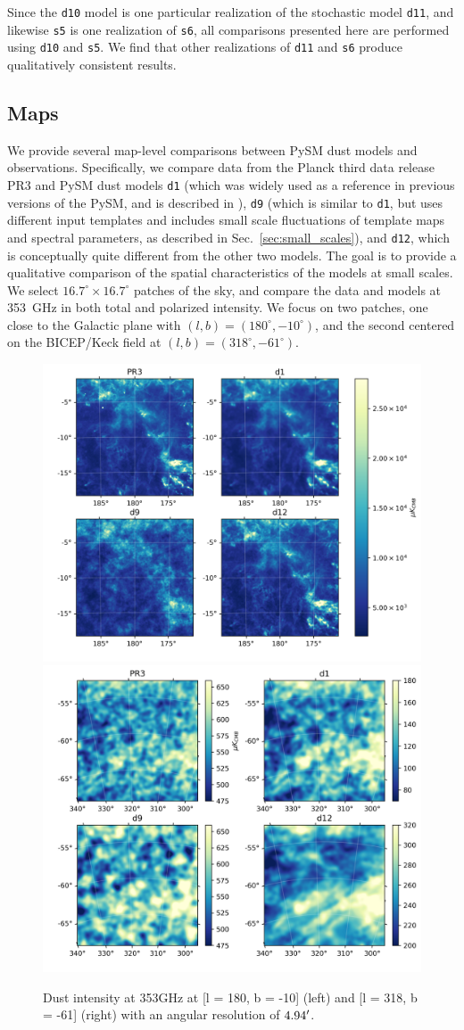 \documentclass[twocolumn]{aastex631}
\begin{document}
Since the \texttt{d10} model is one particular realization of the stochastic model \texttt{d11}, and likewise \texttt{s5} is one realization of \texttt{s6}, all comparisons presented here are performed using \texttt{d10} and \texttt{s5}. We find that other realizations of \texttt{d11} and \texttt{s6} produce qualitatively consistent results.

\subsection{Maps}\label{subsec:maps}

We provide several map-level comparisons between PySM dust models and observations. Specifically, we compare data from the Planck third data release PR3 \cite{planck2016-l03} and PySM dust models \texttt{d1} (which was widely used as a reference in previous versions of the PySM, and is described in \cite{Thorne:2017}), {\tt d9} (which is similar to \texttt{d1}, but uses different input templates and includes small scale fluctuations of template maps and spectral parameters, as described in Sec.~\ref{sec:small_scales}), and {\tt d12}, which is conceptually quite different from the other two models. The goal is to provide a qualitative comparison of the spatial characteristics of the models at small scales. We select $16.7^\circ \times 16.7^\circ$ patches of the sky, and compare the data and models at 353~GHz in both total and polarized intensity. We focus on two patches, one close to the Galactic plane with $(l,b) =(180^\circ,-10^\circ)$, and the second centered on the BICEP/Keck field at $(l,b) =(318^\circ,-61^\circ)$. 

\begin{figure}[t!]
    \centering
    \includegraphics[height=0.395\textwidth]{figures/I_gal_plane.png}
    \includegraphics[height=0.395\textwidth]{figures/I_BK.png}
\caption{Dust intensity at 353GHz at [l = 180, b = -10] (left) and [l = 318, b = -61] (right) with an angular resolution of $4.94\mbox{$^\prime$}$.}    
\label{fig:353_int}
\end{figure}
\end{document}
